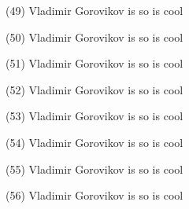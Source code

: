\documentclass{article}%
\begin{document}
\newline%
\begin{minipage}{0.3333333333333333\textwidth}%
(49) Vladimir Gorovikov%
\newline%
%
is so%
\newline%
%
is cool%
\newline%
%
\end{minipage}%
\begin{minipage}{0.3333333333333333\textwidth}%
(50) Vladimir Gorovikov%
\newline%
%
is so%
\newline%
%
is cool%
\newline%
%
\end{minipage}%
\begin{minipage}{0.3333333333333333\textwidth}%
(51) Vladimir Gorovikov%
\newline%
%
is so%
\newline%
%
is cool%
\newline%
%
\end{minipage}%
\newline%
\begin{minipage}{0.3333333333333333\textwidth}%
(52) Vladimir Gorovikov%
\newline%
%
is so%
\newline%
%
is cool%
\newline%
%
\end{minipage}%
\begin{minipage}{0.3333333333333333\textwidth}%
(53) Vladimir Gorovikov%
\newline%
%
is so%
\newline%
%
is cool%
\newline%
%
\end{minipage}%
\begin{minipage}{0.3333333333333333\textwidth}%
(54) Vladimir Gorovikov%
\newline%
%
is so%
\newline%
%
is cool%
\newline%
%
\end{minipage}%
\newline%
\begin{minipage}{0.3333333333333333\textwidth}%
(55) Vladimir Gorovikov%
\newline%
%
is so%
\newline%
%
is cool%
\newline%
%
\end{minipage}%
\begin{minipage}{0.3333333333333333\textwidth}%
(56) Vladimir Gorovikov%
\newline%
%
is so%
\newline%
%
is cool%
\newline%
%
\end{minipage}%
\end{document}
